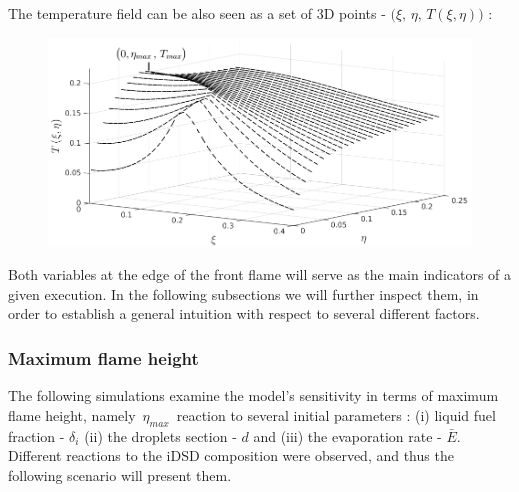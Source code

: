 \documentclass[12pt]{article}
\numberwithin{equation}{section}
\begin{document}
\begin{flushleft}
The temperature field can be also seen as a set of \hypertarget{field_3D}{3D points} - $\big(\xi, \, \eta, \, T(\xi, \eta) \big)$ : %
\begin{figure}[H] 
\centering
\includegraphics[width=1.0\linewidth, center]{T_field_raw.png}
\end{figure} %

Both variables at the edge of the front flame will serve as the main indicators of a given execution. In the following subsections we will further inspect them, in order to establish a general intuition with respect to several different factors.

\newpage

\subsubsection{Maximum flame height}

The following simulations examine the model’s sensitivity in terms of maximum flame height, namely \,$\eta_{max}$\, reaction to several initial parameters : (i) liquid fuel fraction - $\delta_i$ (ii) the droplets section - $d$ and (iii) the evaporation rate - $\bar{E}$. Different reactions to the iDSD composition were observed, and thus the following scenario will present them.




\end{flushleft}
\end{document}

